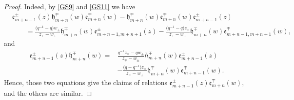 \documentclass[pdftex]{sigma}
\numberwithin{equation}{section}
\begin{document}
\begin{proof}
Indeed, by \eqref{GS9} and \eqref{GS11} we have
\begin{align*}
 &\mathfrak{e}_{m+n-1}^{\pm}(z)\mathfrak{h}_{m+n}^{\mp}(w)\mathfrak{e}_{m+n}^{\mp}(w)-\mathfrak{h}_{m+n}^{\mp}(w)\mathfrak{e}_{m+n}^{\mp}(w)\mathfrak{e}_{m+n-1}^{\pm}(z)\\
&\qquad=\frac{\bigl(q^{-1}-q\bigr)w_{\pm}}{z_{\mp}-w_{\pm}}\mathfrak{h}_{m+n}^{\mp}(w)\mathfrak{e}_{m+n-1,m+n+1}^{\pm}(z)
-\frac{\bigl(q^{-1}-q\bigr)z_{\mp}}{z_{\mp}-w_{\pm}}\mathfrak{h}_{m+n}^{\mp}(w)\mathfrak{e}_{m+n-1,m+n+1}^{\mp}(w),
\end{align*}and
\begin{align*}
 \mathfrak{e}_{m+n-1}^{\pm}(z)\mathfrak{h}_{m+n}^{\mp}(w)={}&\frac{q^{-1}z_{\mp}-qw_{\pm}}{z_{\mp}-w_{\pm}}\mathfrak{}h_{m+n}^{\mp}(w)\mathfrak{e}_{m+n-1}^{\pm}(z)\\
&-\frac{\bigl(q-q^{-1}\bigr)z_{\mp}}{z_{\mp}-w_{\pm}}\mathfrak{h}_{m+n}^{\mp}(w)\mathfrak{e}_{m+n-1}^{\mp}(w).
\end{align*}
Hence, those two equations give the claims of relations $\mathfrak{e}_{m+n-1}^{\pm}(z)\mathfrak{e}_{m+n}^{\mp}(w)$, and the others are similar.
\end{proof}
\end{document}

